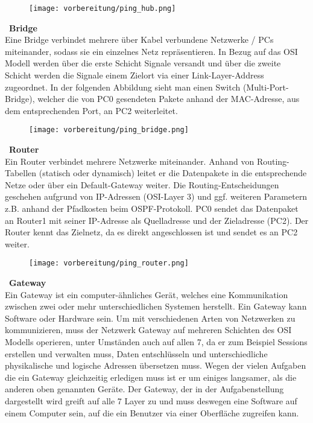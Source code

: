     \begin{figure}[H]
        \centering
        \texttt{[image: vorbereitung/ping\_hub.png]}
    \end{figure}
    \
    \textbf{Bridge}
    \\
    Eine Bridge verbindet mehrere über Kabel verbundene Netzwerke / PCs miteinander, sodass sie ein einzelnes Netz repräsentieren. In Bezug auf das OSI Modell werden über die erste Schicht Signale versandt und über die zweite Schicht werden die Signale einem Zielort via einer Link-Layer-Address zugeordnet. In der folgenden Abbildung sieht man einen Switch (Multi-Port-Bridge), welcher die von PC0 gesendeten Pakete anhand der MAC-Adresse, aus dem entsprechenden Port, an PC2 weiterleitet. \\

    \begin{figure}[H]
        \centering
        \texttt{[image: vorbereitung/ping\_bridge.png]}
    \end{figure}
    \
    \textbf{Router}
    \\
    Ein Router verbindet mehrere Netzwerke miteinander. Anhand von Routing-Tabellen (statisch oder dynamisch) leitet er die Datenpakete in die entsprechende Netze oder über ein Default-Gateway weiter. Die Routing-Entscheidungen geschehen aufgrund von IP-Adressen (OSI-Layer 3) und ggf. weiteren Parametern z.B. anhand der Pfadkosten beim OSPF-Protokoll. PC0 sendet das Datenpaket an Router1 mit seiner IP-Adresse als Quelladresse und der Zieladresse (PC2). Der Router kennt das Zielnetz, da es direkt angeschlossen ist und sendet es an PC2 weiter.\\

    \begin{figure}[H]
        \centering
        \texttt{[image: vorbereitung/ping\_router.png]}
    \end{figure}
    \
    \textbf{Gateway}
    \\
    Ein Gateway ist ein computer-ähnliches Gerät, welches eine Kommunikation zwischen zwei oder mehr unterschiedlichen Systemen herstellt. Ein Gateway kann Software oder Hardware sein. Um mit verschiedenen Arten von Netzwerken zu kommunizieren, muss der Netzwerk Gateway auf mehreren Schichten des OSI Modells operieren, unter Umständen auch auf allen 7, da er zum Beispiel Sessions erstellen und verwalten muss, Daten entschlüsseln und unterschiedliche physikalische und logische Adressen übersetzen muss. Wegen der vielen Aufgaben die ein Gateway gleichzeitig erledigen muss ist er um einiges langsamer, als die anderen oben genannten Geräte. Der Gateway, der in der Aufgabenstellung dargestellt wird greift auf alle 7 Layer zu und muss deswegen eine Software auf einem Computer sein, auf die ein Benutzer via einer Oberfläche zugreifen kann.\\


